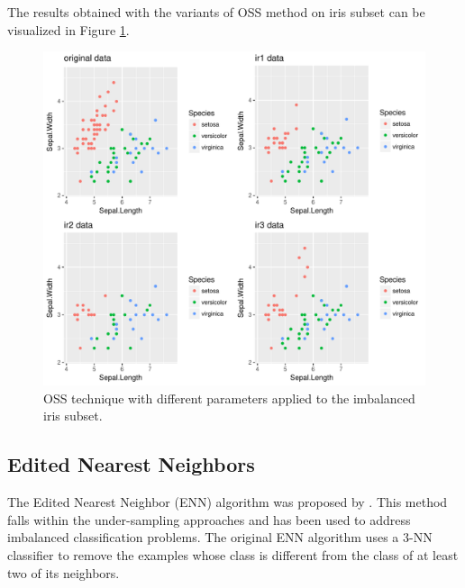 \documentclass[10pt,a4paper]{article}\usepackage[]{graphicx}\usepackage[]{color}
\makeatletter
\def\maxwidth{ %
  \ifdim\Gin@nat@width>\linewidth
    \linewidth
  \else
    \Gin@nat@width
  \fi
}
\newenvironment{knitrout}{}{} %
\makeatother
\begin{document}
The results obtained with the variants of OSS method on iris subset can be visualized in Figure \ref{fig:OSS_plot}.


\begin{knitrout}\footnotesize
{}\color{fgcolor}\begin{figure}

{\centering \includegraphics[width=\maxwidth]{figures/UBL-OSS_plot-1} 

}

\caption[OSS technique with different parameters applied to the imbalanced iris subset]{OSS technique with different parameters applied to the imbalanced iris subset.}\label{fig:OSS_plot}
\end{figure}


\end{knitrout}





\subsection{Edited Nearest Neighbors}\label{sec:ENN}

The Edited Nearest Neighbor (ENN) algorithm was proposed by \cite{wilson1972asymptotic}. This method falls within the under-sampling approaches and has been used to address imbalanced classification problems. The original ENN algorithm uses a 3-NN classifier to remove the examples whose class is different from the class of at least two of its neighbors. 
\end{document}
